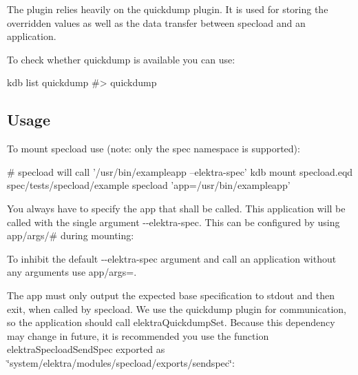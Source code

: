 The plugin relies heavily on the {\ttfamily quickdump} plugin. It is used for storing the overridden values as well as the data transfer between {\ttfamily specload} and an application.

To check whether {\ttfamily quickdump} is available you can use\+:


\begin{DoxyCode}
kdb list quickdump
#> quickdump
\end{DoxyCode}


\subsection*{Usage}

To mount {\ttfamily specload} use (note\+: only the {\ttfamily spec} namespace is supported)\+:


\begin{DoxyCode}
# specload will call '/usr/bin/exampleapp --elektra-spec'
kdb mount specload.eqd spec/tests/specload/example specload 'app=/usr/bin/exampleapp'
\end{DoxyCode}


You always have to specify the {\ttfamily app} that shall be called. This application will be called with the single argument {\ttfamily -\/-\/elektra-\/spec}. This can be configured by using {\ttfamily app/args/\#} during mounting\+:




To inhibit the default {\ttfamily -\/-\/elektra-\/spec} argument and call an application without any arguments use {\ttfamily \textquotesingle{}app/args=\textquotesingle{}}.

The app must only output the expected base specification to {\ttfamily stdout} and then exit, when called by {\ttfamily specload}. We use the {\ttfamily quickdump} plugin for communication, so the application should call {\ttfamily elektra\+Quickdump\+Set}. Because this dependency may change in future, it is recommended you use the function {\ttfamily elektra\+Specload\+Send\+Spec} exported as {\ttfamily \char`\"{}system/elektra/modules/specload/exports/sendspec\char`\"{}}\+:


